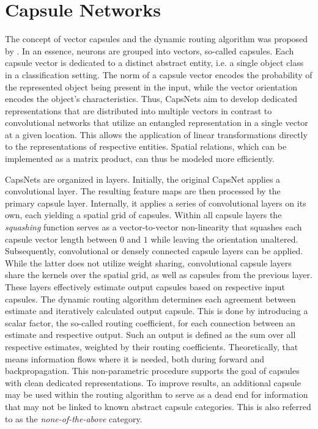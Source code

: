 
\section{Capsule Networks}
\label{sec:capsules}


The concept of vector capsules and the dynamic routing algorithm was proposed by \citet{capsules}. In an essence, neurons are grouped into vectors, so-called capsules. Each capsule vector is dedicated to a distinct abstract entity, i.e. a single object class in a classification setting. The norm of a capsule vector encodes the probability of the represented object being present in the input, while the vector orientation encodes the object's characteristics. Thus, CapsNets aim to develop dedicated representations that are distributed into multiple vectors in contrast to convolutional networks that utilize an entangled representation in a single vector at a given location. This allows the application of linear transformations directly to the representations of respective entities. Spatial relations, which can be implemented as a matrix product, can thus be modeled more efficiently.

CapsNets are organized in layers. Initially, the original CapsNet applies a convolutional layer. The resulting feature maps are then processed by the primary capsule layer. Internally, it applies a series of convolutional layers on its own, each yielding a spatial grid of capsules. Within all capsule layers the \emph{squashing} function serves as a vector-to-vector non-linearity that squashes each capsule vector length between $0$ and $1$ while leaving the orientation unaltered. Subsequently, convolutional or densely connected capsule layers can be applied. While the latter does not utilize weight sharing, convolutional capsule layers share the kernels over the spatial grid, as well as capsules from the previous layer. These layers effectively estimate output capsules based on respective input capsules. The dynamic routing algorithm determines each agreement between estimate and iteratively calculated output capsule. This is done by introducing a scalar factor, the so-called routing coefficient, for each connection between an estimate and respective output. Such an output is defined as the sum over all respective estimates, weighted by their routing coefficients. Theoretically, that means information flows where it is needed, both during forward and backpropagation. This non-parametric procedure supports the goal of capsules with clean dedicated representations. To improve results, an additional capsule may be used within the routing algorithm to serve as a dead end for information that may not be linked to known abstract capsule categories. This is also referred to as the \emph{none-of-the-above} category.

